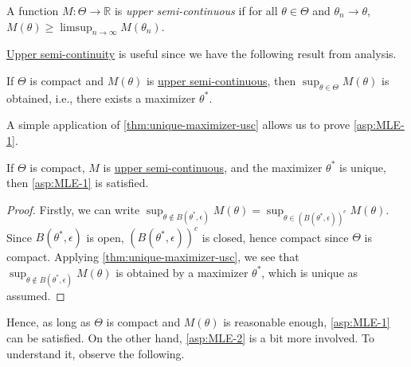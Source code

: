 \begin{definition}\label{def:upper-semi-continuous}
	A function \(M\colon \Theta \to \mathbb{R} \) is \emph{upper semi-continuous} if for all \(\theta \in \Theta \) and \(\theta _n \to \theta \), \(M(\theta ) \geq \limsup_{n \to \infty} M(\theta _n)\).
\end{definition}

\hyperref[def:upper-semi-continuous]{Upper semi-continuity} is useful since we have the following result from analysis.

\begin{theorem}\label{thm:unique-maximizer-usc}
	If \(\Theta \) is compact and \(M(\theta )\) is \hyperref[def:upper-semi-continuous]{upper semi-continuous}, then \(\sup _{\theta \in \Theta } M(\theta )\) is obtained, i.e., there exists a maximizer \(\theta ^{\ast} \).
\end{theorem}

A simple application of \autoref{thm:unique-maximizer-usc} allows us to prove \autoref{asp:MLE-1}.

\begin{corollary}\label{col:asp:MLE-1}
	If \(\Theta \) is compact, \(M\) is \hyperref[def:upper-semi-continuous]{upper semi-continuous}, and the maximizer \(\theta ^{\ast} \) is unique, then \autoref{asp:MLE-1} is satisfied.
\end{corollary}
\begin{proof}
	Firstly, we can write \(\sup _{\theta \notin B(\theta ^{\ast} , \epsilon )} M(\theta ) = \sup _{\theta \in (B(\theta ^{\ast} , \epsilon ))^{c} } M(\theta ) \). Since \(B(\theta ^{\ast} , \epsilon )\) is open, \((B(\theta ^{\ast} , \epsilon ))^{c} \) is closed, hence compact since \(\Theta \) is compact. Applying \autoref{thm:unique-maximizer-usc}, we see that \(\sup _{\theta \notin B(\theta ^{\ast} , \epsilon )} M(\theta )\) is obtained by a maximizer \(\theta ^{\ast} \), which is unique as assumed.
\end{proof}

Hence, as long as \(\Theta \) is compact and \(M(\theta )\) is reasonable enough, \autoref{asp:MLE-1} can be satisfied. On the other hand, \autoref{asp:MLE-2} is a bit more involved. To understand it, observe the following.

